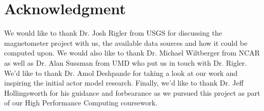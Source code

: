 \documentclass[draftclsnofoot,onecolumn,conference,11pt]{IEEEtran}
\begin{document}


\section*{Acknowledgment}
We would like to thank Dr. Josh Rigler from USGS for discussing the magnetometer project with us, the available data sources and how it could be computed upon. We would also like to thank Dr. Michael Wiltberger from NCAR as well as Dr. Alan Sussman from UMD who put us in touch with Dr. Rigler. We'd like to thank Dr. Amol Deshpande for taking a look at our work and inspiring the initial actor model research. Finally, we'd like to thank Dr. Jeff Hollingsworth for his guidance and forbearance as we pursued this project as part of our High Performance Computing coursework.






\end{document}
